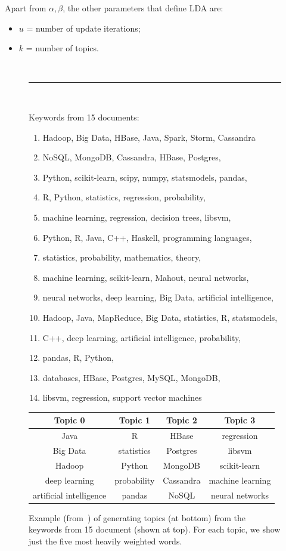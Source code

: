 \documentclass[10pt,conference]{IEEEtran}
\newcommand{\bi}{\begin{itemize}}
\newcommand{\ei}{\end{itemize}}
\newcommand{\be}{\begin{enumerate}}
\newcommand{\ee}{\end{enumerate}}
\theoremstyle{break}
\begin{document}
Apart from $\alpha,\beta$, the other parameters that define LDA
are:
\bi
\item $u$ = number of update iterations;
\item $k$ = number of topics.
\ei



\begin{figure}[!t]
~\hrule~
  
  
      \scriptsize
      \noindent
      Keywords from 15 documents:
      \be
      \item Hadoop, Big Data, HBase, Java, Spark, Storm, 
        Cassandra
        \item
          NoSQL, MongoDB, Cassandra, HBase, Postgres,
          \item
 Python, scikit-learn, scipy, numpy, statsmodels, 
   pandas,
 \item
   R, Python, statistics, regression, probability,
   \item
 machine learning, regression, decision trees, 
   libsvm,
 \item
 Python, R, Java, C++, Haskell, 
   programming languages,
 \item
   statistics, probability, mathematics, theory,
   \item
 machine learning, scikit-learn, Mahout, 
   neural networks,
 \item
 neural networks, deep learning, Big Data, 
   artificial intelligence,
 \item
 Hadoop, Java, MapReduce, Big Data,
 statistics, R, statsmodels,
 \item
 C++, deep learning, artificial intelligence, 
   probability,
 \item
   pandas, R, Python,
   \item
     databases, HBase, Postgres, MySQL, MongoDB,
     \item
 libsvm, regression, support vector machines
\ee


\scriptsize
\begin{center}
\begin{tabular}{c|c|c|c}
 
           Topic 0 &Topic 1 &Topic 2 &Topic 3\\\hline
Java& R& HBase &regression\\
Big Data& statistics& Postgres& libsvm\\
Hadoop& Python& MongoDB& scikit-learn\\
deep learning& probability& Cassandra& machine learning\\
artificial intelligence& pandas& NoSQL& neural networks\\\hline
\end{tabular}
\end{center}
\caption{Example (from~\cite{grus15}) of generating topics (at bottom) from the
  keywords from 15 document
  (shown at top). For each topic, we show just the five most heavily
  weighted words.}\label{fig:lda}
\end{figure}
\end{document}
